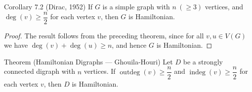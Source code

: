 \documentclass[11pt]{scrartcl}
\theoremstyle{plain}
\theoremstyle{remark}
\begin{document}
\begin{thmbox}{{Corollary 7.2 (Dirac, 1952)}}
If $G$ is a simple graph with $n\ (\geq 3)$ vertices, and $\deg(v) \geq \dfrac{n}{2}$ for each vertex $v$, then $G$ is Hamiltonian.
\end{thmbox}

\begin{proof}
The result follows from the preceding theorem, since for all $v, u \in V(G)$ we have $\deg(v) + \deg(u) \geq n$, and hence $G$ is Hamiltonian.
\end{proof}

\begin{thmbox}{Theorem (Hamiltonian Digraphs --- Ghouila-Houri)}
Let $D$ be a strongly connected digraph with $n$ vertices. If $\operatorname{outdeg}(v) \geq \dfrac{n}{2}$ and $\operatorname{indeg}(v) \geq \dfrac{n}{2}$ for each vertex $v$, then $D$ is Hamiltonian.
\end{thmbox}
\end{document}
